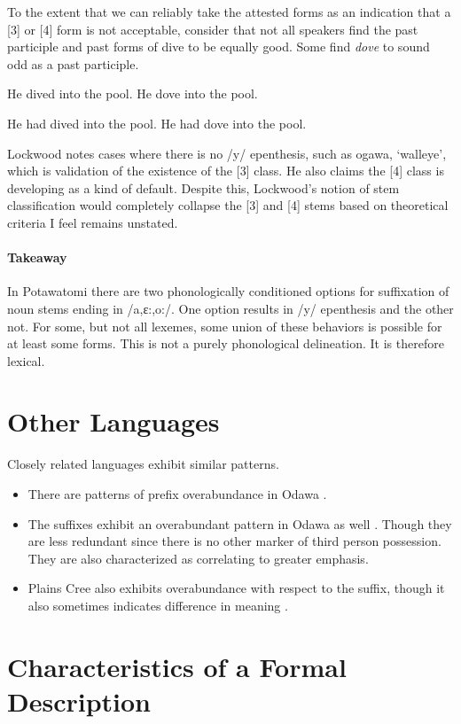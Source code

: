 To the extent that we can reliably take the attested forms as an
indication that a [3] or [4] form is not acceptable, consider that not
all speakers find the past participle and past forms of {\sc dive} to
be equally good. Some find {\it dove} to sound odd as a past
participle.

\pex
\a He dived into the pool.
\a He dove into the pool.
\xe

\pex
\a He had dived into the pool.
\a He had dove into the pool.
\xe

Lockwood notes cases where there is no /y/ epenthesis, such as {\sc
  ogawa}, `walleye', which is validation of the existence of the [3]
class. He also claims the [4] class is developing as a kind of
default. Despite this, Lockwood's notion of stem classification would
completely collapse the [3] and [4] stems based on theoretical
criteria I feel remains unstated.

\paragraph{Takeaway} In Potawatomi there are two phonologically
conditioned options for suffixation of noun stems ending in
/a,ɛ:,o:/. One option results in /y/ epenthesis and the other not. For
some, but not all lexemes, some union of these behaviors is possible
for at least some forms. This is not a purely phonological
delineation. It is therefore lexical.

\section{Other Languages}

Closely related languages exhibit similar patterns.

\begin{itemize}
\item There are patterns of prefix overabundance in Odawa
  \citep{odawagrammar}.
\item The suffixes exhibit an overabundant pattern in Odawa as well
  \citep{odawagrammar}. Though they are less redundant since there is
  no other marker of third person possession. They are also
  characterized as correlating to greater emphasis.
\item Plains Cree also exhibits overabundance with respect to the
  suffix, though it also sometimes indicates difference in meaning
  \citep{ahenakew1987cree}.
\end{itemize}

\section{Characteristics of a Formal Description}

